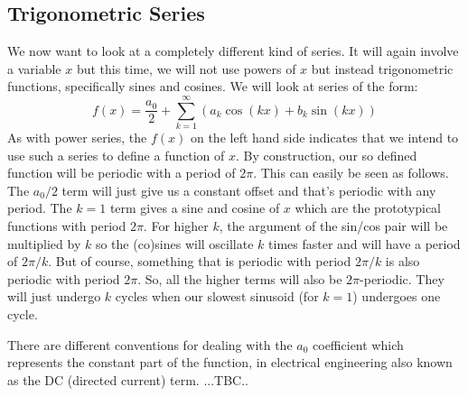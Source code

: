 \subsection{Trigonometric Series}
We now want to look at a completely different kind of series. It will again involve a variable $x$ but this time, we will not use powers of $x$ but instead trigonometric functions, specifically sines and cosines. We will look at series of the form:
\begin{equation}
\label{Eq:FourierSeries}
 f(x) = \frac{a_0}{2} + \sum_{k=1}^\infty \left(  a_k \cos(k x) + b_k \sin(k x) \right)
\end{equation}
As with power series, the $f(x)$ on the left hand side indicates that we intend to use such a series to define a function of $x$. By construction, our so defined function will be periodic with a period of $2\pi$. This can easily be seen as follows. The $a_0/2$ term will just give us a constant offset and that's periodic with any period. The $k=1$ term gives a sine and cosine of $x$ which are the prototypical functions with period $2\pi$. For higher $k$, the argument of the sin/cos pair will be multiplied by $k$ so the (co)sines will oscillate $k$ times faster and will have a period of $2\pi/k$. But of course, something that is periodic with period $2\pi/k$ is also periodic with period $2\pi$. So, all the higher terms will also be $2\pi$-periodic. They will just undergo $k$ cycles when our slowest sinusoid (for $k=1$) undergoes one cycle.

\medskip
There are different conventions for dealing with the $a_0$ coefficient which represents the constant part of the function, in electrical engineering also known as the DC (directed current) term. ...TBC..



